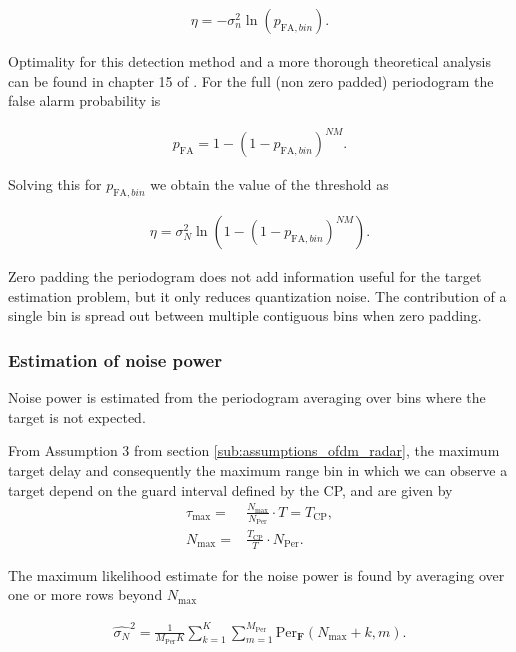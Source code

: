 				\begin{align*}
					\eta = -\sigma_n^2 \ln(p_{\text{FA},bin}) .
				\end{align*} 
				
				Optimality for this detection method and a more thorough theoretical analysis can be found in chapter 15 of \cite{Richards_Scheer_Holm_2010}.
				For the full (non zero padded) periodogram the false alarm probability is
				
				\begin{align*}
					p_\text{FA} = 1 - (1 - p_{\text{FA},bin})^{NM}.
				\end{align*}
				
				Solving this for $p_{\text{FA},bin}$ we obtain the value of the threshold as 
				
				\begin{align*}
					\eta = \sigma_N^2 \ln{(1 - (1 - p_{\text{FA},bin})^{NM})}.
				\end{align*}
				
				Zero padding the periodogram does not add information useful for the target estimation problem, but it only reduces quantization noise. The contribution of a single bin is spread out between multiple contiguous bins when zero padding.

				\subsubsection{Estimation of noise power}
	
					Noise power is estimated from the periodogram averaging over bins where the target is not expected.
					
					From Assumption 3 from section \ref{sub:assumptions_ofdm_radar}, the maximum target delay and consequently the maximum range bin in which we can observe a target depend on the guard interval defined by the CP, and are given by
					\begin{align*}
						\tau_{\text{max}} =& \frac{N_{\text{max}}}{N_{\text{Per}}}\cdot T = T_\text{CP} ,\\
						N_{\text{max}} =& \frac{T_\text{CP}}{T}\cdot N_{\text{Per}}.
					\end{align*} 
					
					The maximum likelihood estimate for the noise power is found by averaging over one or more rows beyond $N_{\text{max}}$
			
					\begin{align}
					\label{align: threshold_noise_power}
						\hat{\sigma_N}^2 = \frac{1}{M_{\text{Per}}K} \sum_{k=1}^K \sum_{m=1}^{M_{\text{Per}}} \text{Per}_{\bm{F}}(N_{\text{max}}+k, m).
					\end{align}
			
